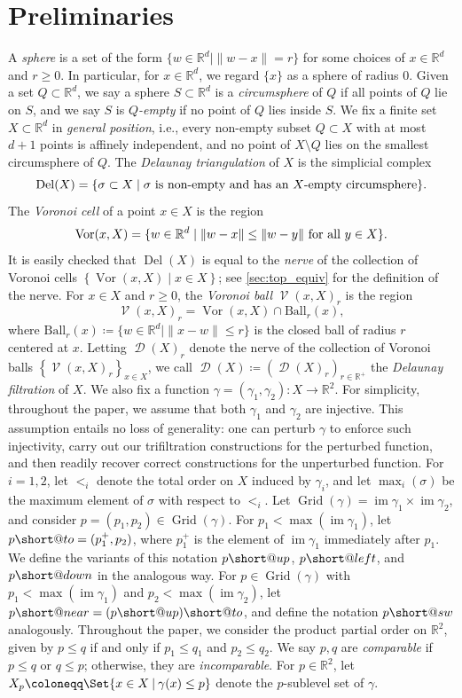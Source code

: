 \documentclass[11pt]{amsart}
\makeatletter
\newcommand{\R}{\mathbb{R}} %
\newcommand{\Ball}{\text{Ball}}
\DeclareMathOperator{\V}{\mathcal{V}}
\DeclareMathOperator{\Vor}{Vor}
\DeclareMathOperator{\DelT}{Del}
\DeclareMathOperator{\Del}{\mathcal{D}}
\DeclareMathOperator{\Grid}{\mathrm{Grid}}
\DeclareMathOperator{\im}{im}
\newcommand{\deff}{\emph}
\providecommand\given{}
\newcommand\SetSymbol[1][]{%
  \nonscript\:#1\vert
  \allowbreak
  \nonscript\:
  \mathopen{}}
\renewcommand\given{\SetSymbol[]}
\DeclareRobustCommand{\subto}{%
  \mathrel{\mathpalette\short@to\relax}%
}
\newcommand{\short@to}[2]{%
  \mkern2mu
  \clipbox{{.35\width} 0 0 0}{$\m@th#1\vphantom{+}{\rightarrow}$}%
  }
\DeclareRobustCommand{\subleft}{%
  \mathrel{\mathpalette\short@left\relax}%
}
\newcommand{\short@left}[2]{%
  \mkern2mu
  \clipbox{0 0 {.35\width} 0}{$\m@th#1\vphantom{+}{\leftarrow}$}%
  }
\DeclareRobustCommand{\subup}{%
  \mathrel{\mathpalette\short@up\relax}%
}
\newcommand{\short@up}[2]{%
  \mkern2mu
  \clipbox{0 {.35\height} 0 0}{$\m@th#1\vphantom{+}{\uparrow}$}%
}
\DeclareRobustCommand{\subdown}{%
  \mathrel{\mathpalette\short@down\relax}%
}
\newcommand{\short@down}[2]{%
  \mkern2mu
  \clipbox{0 0 0 {.45\height}}{$\m@th#1\vphantom{+}{\downarrow}$}%
}
\DeclareRobustCommand{\subupright}{%
  \mathrel{\mathpalette\short@near\relax}%
}
\newcommand{\short@near}[2]{%
  \mkern2mu
  \clipbox{{.55\width} {.55\height} 0 0}{$\m@th#1\vphantom{+}{\nearrow}$}%
}
\DeclareRobustCommand{\subdownleft}{%
  \mathrel{\mathpalette\short@sw\relax}%
}
\newcommand{\short@sw}[2]{%
  \mkern2mu
  \clipbox{0 0 {.55\width} {.55\height}}{$\m@th#1\vphantom{+}{\swarrow}$}%
}
\theoremstyle{plain}
\theoremstyle{definition}
\theoremstyle{remark}
\makeatother
\begin{document}
\section{Preliminaries}\label{Sec:Preliminaries}
A \emph{sphere} is a set of the form $\{w\in \R^d\mid \|w-x\|=r\}$ for some choices of $x\in \R^d$ and $r\geq 0$.  In particular, for $x\in \R^d$, we regard $\{x\}$ as a sphere of radius 0.
Given a set $Q\subset \R^d$, we say a sphere $S\subset \R^d$ is a \emph{circumsphere} of $Q$ if all points of $Q$ lie on $S$, and we say  $S$ is \emph{$Q$-empty} if no point of $Q$ lies inside $S$.  
%
We fix a finite set $X\subset\R^{d}$ in \emph{general position}, i.e., every non-empty subset $Q \subset X$ with at most $d+1$ points is affinely
independent, and no point of $X \setminus Q$ lies on the smallest circumsphere
of $Q$.  The \emph{Delaunay triangulation} of $X$ is the simplicial complex \[\DelT(X)=\{\sigma\subset X\mid \sigma \textup{ is non-empty and has an $X$-empty circumsphere}\}.\]  
  The \deff{Voronoi cell} of a point $x\in X$ is the region
  \[\Vor(x, X) = \{w \in \R^d \mid  \|w - x\| \leq \|w - y\| \textup{ for all } y\in X\}.\]
It is easily checked that $\DelT(X)$ is equal to the \emph{nerve} of the collection of Voronoi cells $\left\{\Vor(x, X) \mid x\in X \right\}$; see \cref{sec:top_equiv} for the definition of the nerve.  
%
For $x\in X$ and $r\geq 0$, the \deff{Voronoi ball} $\V(x,X)_r$ is the region
 \[\V(x,X)_r = \Vor(x, X) \cap \Ball_r(x),\]
 where $\Ball_r(x)\coloneqq \{w\in \R^d \mid \|x-w\|\leq r\}$ is the closed ball of radius $r$ centered at $x$.     
Letting $\Del(X)_r$ denote the nerve of the collection of Voronoi balls $\left\{\V(x,X)_r \right\}_{x\in X}$, we call $\Del(X)\coloneqq (\Del(X)_r)_{r\in \R^+}$ the \emph{Delaunay filtration} of $X$.  
%
%
%
We also fix a function $\gamma = (\gamma_1, \gamma_2) \colon X\to \R^{2}$. 
For simplicity, throughout the paper, we assume that both $\gamma_1$ and $\gamma_2$ are injective.  
This assumption entails no loss of generality: one can perturb $\gamma$ to enforce such injectivity, carry out our trifiltration constructions for the perturbed function, and then readily recover correct constructions for the unperturbed function. %
For $i=1,2$, let $<_i$ denote the total order on $X$ induced by $\gamma_{i}$, and  %
let $\max_{i}(\sigma)$ be  the maximum element of $\sigma$ with respect to $<_i$.
%
Let $\Grid(\gamma)=\im \gamma_1\times \im \gamma_2$, and consider $p=(p_1, p_2)\in \Grid(\gamma)$.  For $p_1<\max(\im \gamma_1)$, let $p{\subto}=(p_1^+,p_2)$, where $p_1^+$ is the element of $\im \gamma_1$ immediately after $p_1$.  
We define the variants of this notation $p{\subup}$, $p{\subleft}$, and $p{\subdown}$ in the analogous way.  For $p\in \Grid(\gamma)$ with $p_1<\max(\im \gamma_1)$ and $p_2<\max(\im \gamma_2)$, let $p{\subupright}=(p{\subup}){\subto}$, and define the notation $p{\subdownleft}$ analogously.
%
Throughout the paper, we consider the product partial order on $\R^2$, given by $p\leq q$ if and only if $p_1\leq q_1$ and $p_2\leq q_2$.  We say $p,q$ are \emph{comparable} if $p \leq q$ or $q \leq p$; otherwise, they are \emph{incomparable}.  For $p\in\R^{2}$, let $X_{p}\coloneqq \Set{x\in X\given \gamma(x) \leq p}$ denote the $p$-sublevel set of $\gamma$.
%
\end{document}
